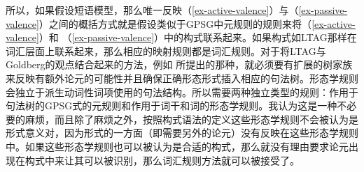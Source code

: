 \begin{exe}
\begin{xlist}[iv.]
\begin{exe}
\begin{xlist}[iv.]
所以，如果假设短语模型，那么唯一反映（\ref{ex-active-valence}）与（\ref{ex-passive-valence}）之间的概括方式就是假设类似于GPSG中元规则的规则来将（\ref{ex-active-valence}）和 （\ref{ex-passive-valence}）中的构式联系起来。如果构式如LTAG那样在词汇层面上联系起来，那么相应的映射规则都是词汇规则。对于将LTAG与Goldberg的观点结合起来的方法，例如 \citet{KO2012a}所提出的那种，就必须要有扩展的树家族来反映有额外论元的可能性并且确保正确形态形式插入相应的句法树。形态学规则会独立于派生动词性词项使用的句法结构。所以需要两种独立类型的规则：作用于句法树的GPSG式的元规则和作用于词干和词的形态学规则。我认为这是一种不必要的麻烦，而且除了麻烦之外，按照构式语法的定义这些形态学规则不会被认为是形式意义对，因为形式的一方面（即需要另外的论元）没有反映在这些形态学规则中。如果这些形态学规则也可以被认为是合适的构式，那么就没有理由要求论元出现在构式中来让其可以被识别，那么词汇规则方法就可以被接受了。


\end{xlist}
\end{exe}
\end{xlist}
\end{exe}
